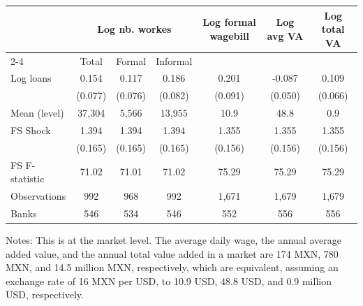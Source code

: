 \centering
\begin{threeparttable}
\begin{tabular}{lcccccc}
\toprule
 & \multicolumn{3}{c}{Log nb. workes} & \multirow{2}{*}{Log formal wagebill} & \multirow{2}{*}{Log avg VA} & \multirow{2}{*}{Log total VA} \\
\cmidrule(lr){2-4}
 & Total & Formal & Informal &  &  &  \\
\midrule
Log loans 
& 0.154 & 0.117 & 0.186 & 0.201  & -0.087  & 0.109 \\
& (0.077) & (0.076) & (0.082) & (0.091) & (0.050) & (0.066) \\
\midrule
Mean (level) & 37,304 & 5,566 & 13,955 & 10.9 & 48.8 & 0.9 \\
\midrule
FS Shock & 1.394 & 1.394 & 1.394 & 1.355 & 1.355 & 1.355 \\
& (0.165) & (0.165) & (0.165) & (0.156) & (0.156) & (0.156) \\
FS F-statistic & 71.02 & 71.01 & 71.02 & 75.29 & 75.29 & 75.29 \\
Observations & 992 & 968 & 992 & 1,671 & 1,679 & 1,679 \\
Banks & 546 & 534 & 546 & 552 & 556 & 556 \\
\bottomrule
\end{tabular}
\begin{tablenotes}[flushleft]
\tiny
\item Notes: This is at the market level. The average daily wage, the annual average added value, and the annual total value added in a market are 174 MXN, 780 MXN, and 14.5 million MXN, respectively, which are equivalent, assuming an exchange rate of 16 MXN per USD, to 10.9 USD, 48.8 USD, and 0.9 million USD, respectively.
\end{tablenotes}
\end{threeparttable}